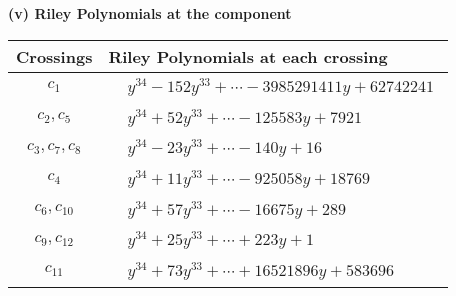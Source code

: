 \documentclass[1p]{elsarticle_modified}
\theoremstyle{definition}
\begin{document}
\flushleft \textbf{(v) Riley Polynomials at the component}\newline \\
\begin{tabular}{m{50pt}|m{274pt}}
Crossings & \hspace{64pt}Riley Polynomials at each crossing \\
\hline $$\begin{aligned}c_{1}\end{aligned}$$&$\begin{aligned}
&y^{34}-152 y^{33}+\cdots-3985291411 y+62742241
\end{aligned}$\\
\hline $$\begin{aligned}c_{2},c_{5}\end{aligned}$$&$\begin{aligned}
&y^{34}+52 y^{33}+\cdots-125583 y+7921
\end{aligned}$\\
\hline $$\begin{aligned}c_{3},c_{7},c_{8}\end{aligned}$$&$\begin{aligned}
&y^{34}-23 y^{33}+\cdots-140 y+16
\end{aligned}$\\
\hline $$\begin{aligned}c_{4}\end{aligned}$$&$\begin{aligned}
&y^{34}+11 y^{33}+\cdots-925058 y+18769
\end{aligned}$\\
\hline $$\begin{aligned}c_{6},c_{10}\end{aligned}$$&$\begin{aligned}
&y^{34}+57 y^{33}+\cdots-16675 y+289
\end{aligned}$\\
\hline $$\begin{aligned}c_{9},c_{12}\end{aligned}$$&$\begin{aligned}
&y^{34}+25 y^{33}+\cdots+223 y+1
\end{aligned}$\\
\hline $$\begin{aligned}c_{11}\end{aligned}$$&$\begin{aligned}
&y^{34}+73 y^{33}+\cdots+16521896 y+583696
\end{aligned}$\\
\hline
\end{tabular}\\~\\
\end{document}
